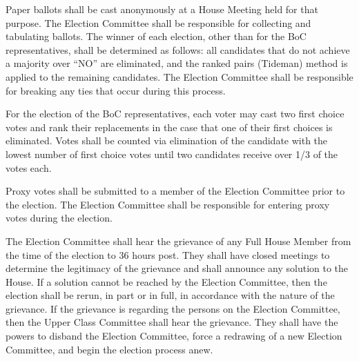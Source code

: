 \documentclass[10pt]{article} %
\begin{document}
Paper ballots shall be cast anonymously at a House Meeting held for that purpose. The Election Committee shall be responsible for collecting and tabulating ballots. The winner of each election, other than for the BoC representatives, shall be determined as follows: all candidates that do not achieve a majority over ``NO'' are eliminated, and the ranked pairs (Tideman) method is applied to the remaining candidates. The Election Committee shall be responsible for breaking any ties that occur during this process.

For the election of the BoC representatives, each voter may cast two first choice votes and rank their replacements in the case that one of their first choices is eliminated. Votes shall be counted via elimination of the candidate with the lowest number of first choice votes until two candidates receive over 1/3 of the votes each.

Proxy votes shall be submitted to a member of the Election Committee prior to the election. The Election Committee shall be responsible for entering proxy votes during the election.

The Election Committee shall hear the grievance of any Full House Member from the time of the election to 36 hours post. They shall have closed meetings to determine the legitimacy of the grievance and shall announce any solution to the House. If a solution cannot be reached by the Election Committee, then the election shall be rerun, in part or in full, in accordance with the nature of the grievance. If the grievance is regarding the persons on the Election Committee, then the Upper Class Committee shall hear the grievance. They shall have the powers to disband the Election Committee, force a redrawing of a new Election Committee, and begin the election process anew.
\end{document}
